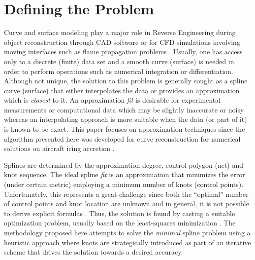 \documentclass[a4paper,12pt]{article}
\author{Julia Docampo}
\begin{document}
 
 
 \section{Defining the Problem}
 Curve and surface modeling play a major role in Reverse Engineering during object reconstruction
  through CAD software \cite{Ma1998, sarkar1991} or for CFD simulations involving moving
  interfaces such as flame propagation problems \cite{malladi1995}. 
  Usually, one has access only to a discrete (finite) data set 
  and a smooth curve (surface) is needed in order to perform operations such as numerical integration or differentiation. 
  Although not unique, the solution to this problem is generally sought as a spline curve (surface)  
  that either interpolates the data or provides an approximation which is \emph{closest} to it.
   An approximation \emph{fit} is desirable for experimental measurements or computational data 
   which may be slightly inaccurate or noisy whereas an interpolating approach \cite{piegl1999,ma1995} 
   is more suitable when
   the data (or part of it) is known to be exact. This paper focuses on 
   approximation techniques since the algorithm presented here was developed for 
    curve reconstruction for numerical solutions on aircraft icing accretion \cite{}. 
    
    Splines are determined by the approximation degree, 
    control polygon (net) and knot sequence. The ideal spline \emph{fit} is an approximation
     that minimizes the error (under certain metric) employing a minimum number 
     of knots (control points).  Unfortunately, this represents a great challenge since both the ``optimal'' number of control points 
  and knot location are unknown and in general, it is not possible to derive explicit formulas \cite{jupp1978}.  
  Thus, the solution is found by casting a suitable optimization problem, 
  usually based on the least-squares minimization \cite{nurbs_book, deboor2001practical, schumaker2015spline}. 
   The methodology proposed here attempts to solve the \emph{minimal} spline problem 
    using a heuristic approach where knots are strategically introduced 
   as part of an iterative scheme that drives the solution towards a desired accuracy. 
      
\end{document}
